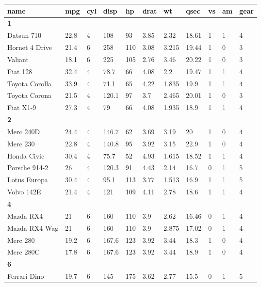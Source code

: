 \documentclass[
]{book}
\begin{document}
\begin{table}[H]
\centering
\setlength{\tabcolsep}{5pt} 
\begin{threeparttable}
\renewcommand{\arraystretch}{1.3}
\begin{tabular}[h]{lllllllllll}
\hline
name & mpg & cyl & disp & hp & drat & wt & qsec & vs & am & gear \\
\hline
\multicolumn{11}{l}{\textbf{1}}\\
Datsun 710 & 22.8 & 4 & 108 & 93 & 3.85 & 2.32 & 18.61 & 1 & 1 & 4 \\
Hornet 4 Drive & 21.4 & 6 & 258 & 110 & 3.08 & 3.215 & 19.44 & 1 & 0 & 3 \\
Valiant & 18.1 & 6 & 225 & 105 & 2.76 & 3.46 & 20.22 & 1 & 0 & 3 \\
Fiat 128 & 32.4 & 4 & 78.7 & 66 & 4.08 & 2.2 & 19.47 & 1 & 1 & 4 \\
Toyota Corolla & 33.9 & 4 & 71.1 & 65 & 4.22 & 1.835 & 19.9 & 1 & 1 & 4 \\
Toyota Corona & 21.5 & 4 & 120.1 & 97 & 3.7 & 2.465 & 20.01 & 1 & 0 & 3 \\
Fiat X1-9 & 27.3 & 4 & 79 & 66 & 4.08 & 1.935 & 18.9 & 1 & 1 & 4 \\
\hline \multicolumn{11}{l}{\textbf{2}}\\
Merc 240D & 24.4 & 4 & 146.7 & 62 & 3.69 & 3.19 & 20 & 1 & 0 & 4 \\
Merc 230 & 22.8 & 4 & 140.8 & 95 & 3.92 & 3.15 & 22.9 & 1 & 0 & 4 \\
Honda Civic & 30.4 & 4 & 75.7 & 52 & 4.93 & 1.615 & 18.52 & 1 & 1 & 4 \\
Porsche 914-2 & 26 & 4 & 120.3 & 91 & 4.43 & 2.14 & 16.7 & 0 & 1 & 5 \\
Lotus Europa & 30.4 & 4 & 95.1 & 113 & 3.77 & 1.513 & 16.9 & 1 & 1 & 5 \\
Volvo 142E & 21.4 & 4 & 121 & 109 & 4.11 & 2.78 & 18.6 & 1 & 1 & 4 \\
\hline \multicolumn{11}{l}{\textbf{4}}\\
Mazda RX4 & 21 & 6 & 160 & 110 & 3.9 & 2.62 & 16.46 & 0 & 1 & 4 \\
Mazda RX4 Wag & 21 & 6 & 160 & 110 & 3.9 & 2.875 & 17.02 & 0 & 1 & 4 \\
Merc 280 & 19.2 & 6 & 167.6 & 123 & 3.92 & 3.44 & 18.3 & 1 & 0 & 4 \\
Merc 280C & 17.8 & 6 & 167.6 & 123 & 3.92 & 3.44 & 18.9 & 1 & 0 & 4 \\
\hline \multicolumn{11}{l}{\textbf{6}}\\
Ferrari Dino & 19.7 & 6 & 145 & 175 & 3.62 & 2.77 & 15.5 & 0 & 1 & 5 \\
\hline
\end{tabular}
\end{threeparttable}
\end{table}
\end{document}
